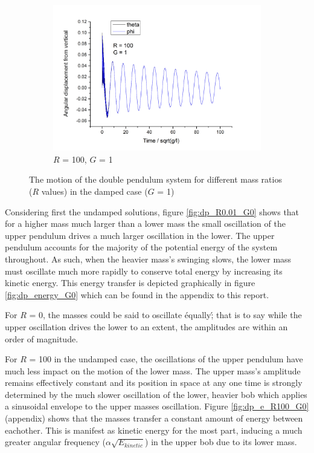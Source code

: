\documentclass[11pt]{article}
\begin{document}
\begin{figure}[h!]
\begin{subfigure}[h]{0.5\textwidth}
    \includegraphics[width=\textwidth]{img/dp/R=100_G=1.png}
    \captionsetup{width=0.85\textwidth}
    \caption{$R$ = 100, $G$ = 1}
    \label{fig:dp_R100_G1}
  \end{subfigure}
  \caption{The motion of the double pendulum system for different mass ratios ($R$ values) in the damped case ($G$ = 1)}
\end{figure}

Considering first the undamped solutions, figure \ref{fig:dp_R0.01_G0} shows that for a higher mass much larger than a lower mass the small oscillation of the upper pendulum drives a much larger oscillation in the lower. The upper pendulum accounts for the majority of the potential energy of the system throughout. As such, when the heavier mass's swinging slows, the lower mass must oscillate much more rapidly to conserve total energy by increasing its kinetic energy.
This energy transfer is depicted graphically in figure \ref{fig:dp_energy_G0} which can be found in the appendix to this report.

For $R$ = 0, the masses could be said to oscillate \'equally\'; that is to say while the upper oscillation drives the lower to an extent, the amplitudes are within an order of magnitude.

For $R$ = 100 in the undamped case, the oscillations of the upper pendulum have much less impact on the motion of the lower mass. The upper mass's amplitude remains effectively constant and its position in space at any one time is strongly determined by the much slower oscillation of the lower, heavier bob which applies a sinusoidal envelope to the upper masses oscillation. Figure \ref{fig:dp_e_R100_G0} (appendix) shows that the masses transfer a constant amount of energy between eachother. This is manifest as kinetic energy for the most part, inducing a much greater angular frequency ($\alpha \sqrt{E_{kinetic}}$) in the upper bob due to its lower mass.
\end{document}
